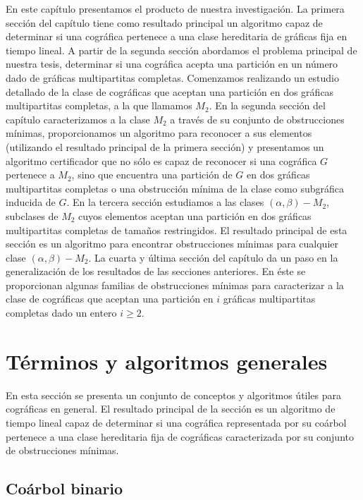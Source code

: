 En este capítulo presentamos el producto de nuestra investigación. La primera
sección del capítulo tiene como resultado principal un algoritmo capaz de
determinar si una cográfica pertenece a una clase hereditaria de gráficas fija
en tiempo lineal. A partir de la segunda sección abordamos el problema
principal de nuestra tesis, determinar si una cográfica acepta una partición en
un número dado de gráficas multipartitas completas. Comenzamos realizando un
estudio detallado de la clase de cográficas que aceptan una partición en dos
gráficas multipartitas completas, a la que llamamos $M_2$. En la segunda
sección del capítulo caracterizamos a la clase $M_2$ a través de su conjunto de
obstrucciones mínimas, proporcionamos un algoritmo para reconocer a sus
elementos (utilizando el resultado principal de la primera sección) y
presentamos un algoritmo certificador que no sólo es capaz de reconocer si una
cográfica $G$ pertenece a  $M_2$, sino que encuentra una partición de $G$ en
dos gráficas multipartitas completas o una obstrucción mínima de la clase como
subgráfica inducida de $G$. En la tercera sección estudiamos a las clases
$(\alpha, \beta)-M_2$, subclases de $M_2$ cuyos elementos aceptan una partición
en dos gráficas multipartitas completas de tamaños restringidos. El resultado
principal de esta sección es un algoritmo para encontrar obstrucciones mínimas
para cualquier clase $(\alpha, \beta)-M_2$. La cuarta y última sección del
capítulo da un paso en la generalización de los resultados de las secciones
anteriores. En éste se proporcionan algunas familias de obstrucciones mínimas
para caracterizar a la clase de cográficas que aceptan una partición en $i$
gráficas multipartitas completas dado un entero $i \geq 2$.

\section{Términos y algoritmos generales}
    En esta sección se presenta un conjunto de conceptos y algoritmos
    \'utiles para cogr\'aficas en general. El resultado
    principal de la sección es un algoritmo de tiempo lineal capaz de
    determinar si una cográfica representada por su coárbol pertenece a una
    clase hereditaria fija de cográficas caracterizada por su conjunto de
    obstrucciones mínimas.

    \subsection{Coárbol binario}
        
